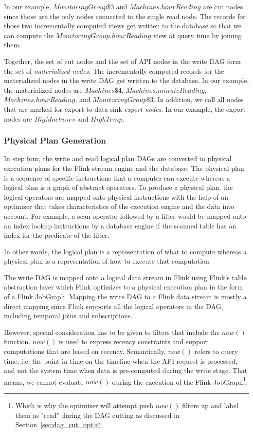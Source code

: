 \documentclass[	DIV=calc,%
							paper=letter,%
							fontsize=11pt,%
							twocolumn]{scrartcl}	 					%
\begin{document}
In our example, $MonitoringGroup\$3$ and $Machines.hourReading$ are cut nodes since those are the only nodes connected to the single read node. The records for those two incrementally computed views get written to the database so that we can compute the $MonitoringGroup.hourReading$ view at query time by joining them.

Together, the set of cut nodes and the set of API nodes in the write DAG form the set of \emph{materialized nodes}. The incrementally computed records for the materialized nodes in the write DAG get written to the database. In our example, the materialized nodes are $Machines\$4$, $Machines.minuteReading$, $Machines.hourReading$, and $MonitoringGroup\$3$.
In addition, we call all nodes that are marked for export to data sink \emph{export nodes}. In our example, the export nodes are $BigMachines$ and $HighTemp$.

\subsubsection{Physical Plan Generation}

In step four, the write and read logical plan DAGs are converted to physical execution plans for the Flink stream engine and the database. The physical plan is a sequence of specific instructions that a computer can execute whereas a logical plan is a graph of abstract operators. To produce a physical plan, the logical operators are mapped onto physical instructions with the help of an optimizer that takes characteristics of the execution engine and the data into account. For example, a scan operator followed by a filter would be mapped onto an index lookup instructions by a database engine if the scanned table has an index for the predicate of the filter.

In other words, the logical plan is a representation of what to compute whereas a physical plan is a representation of how to execute that computation.

The write DAG is mapped onto a logical data stream in Flink using Flink's table abstraction layer which Flink optimizes to a physical execution plan in the form of a Flink JobGraph. Mapping the write DAG to a Flink data stream is mostly a direct mapping since Flink supports all the logical operators in the DAG, including temporal joins and subscriptions.

However, special consideration has to be given to filters that include the $now()$ function. $now()$ is used to express recency constraints and support computations that are based on recency. Semantically, $now()$ refers to query time, i.e. the point in time on the timeline when the API request is processed, and not the system time when data is pre-computed during the write stage. That means, we cannot evaluate $now()$ during the execution of the Flink JobGraph\footnote{Which is why the optimizer will attempt push $now()$ filters up and label them as "read" during the DAG cutting as discussed in Section~\ref{sec:dag_cut_opt}}.
\end{document}
